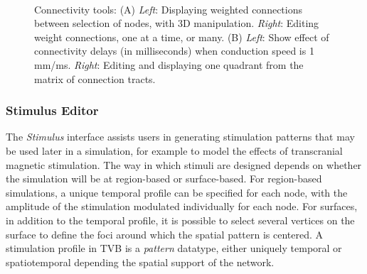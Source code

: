 \documentclass{bioinfo}
\begin{document}
 \begin{figure}[!htbp]
		\centering
		\\
		\caption{Connectivity tools: 
            (A) \textit{Left}: Displaying weighted connections between selection of nodes, with 3D manipulation.
            \textit{Right}: Editing weight connections, one at a time, or many.
            (B) \textit{Left}: Show effect of connectivity delays (in milliseconds) when conduction speed is 1 mm/ms.
        \textit{Right}: Editing and displaying one quadrant from the matrix of connection tracts.}
				\label{fig:connectivity}
\end{figure}

\subsubsection{Stimulus Editor}

    The \emph{Stimulus} interface assists users in generating
	stimulation patterns that may be used later in a simulation, for 
    example to model the effects of transcranial magnetic stimulation.
    The way in which stimuli are designed depends on whether the simulation
    will be at region-based or surface-based.
	For region-based simulations, a
	unique temporal profile can be specified for each node, with the amplitude
	of the stimulation modulated individually for each node. For surfaces,
	in addition to the temporal profile, it is possible to select several vertices
	on the surface to define the foci around which the spatial pattern is centered.
    A stimulation profile in TVB is a \emph{pattern}
	datatype, either uniquely temporal or spatiotemporal depending the
	spatial support of the network.
\end{document}
